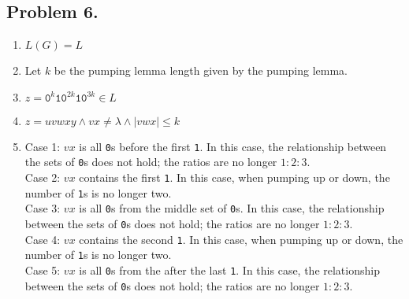 \documentclass{article}
\begin{document}
\subsection*{Problem 6.}

\begin{enumerate}
  \item \(L\left(G\right) = L\)
  \item Let \(k\) be the pumping lemma length given by the pumping lemma.
  \item \(z = \texttt{0}^{k}\texttt{1}\texttt{0}^{2k}\texttt{1}\texttt{0}^{3k} \in L\)
  \item \(z = uvwxy \wedge vx \neq \lambda \wedge \left|vwx\right| \leq k\)
  \item Case 1: \(vx\) is all \texttt{0}s before the first \texttt{1}.  In this case, the relationship between the sets of \texttt{0}s does not hold; the ratios are no longer \(1:2:3\).\\
  Case 2: \(vx\) contains the first \texttt{1}.  In this case, when pumping up or down, the number of \texttt{1}s is no longer two.\\
  Case 3: \(vx\) is all \texttt{0}s from the middle set of \texttt{0}s.  In this case, the relationship between the sets of \texttt{0}s does not hold; the ratios are no longer \(1:2:3\).\\
  Case 4: \(vx\) contains the second \texttt{1}.  In this case, when pumping up or down, the number of \texttt{1}s is no longer two.\\
  Case 5: \(vx\) is all \texttt{0}s from the after the last \texttt{1}.  In this case, the relationship between the sets of \texttt{0}s does not hold; the ratios are no longer \(1:2:3\).\\
\end{enumerate}
\end{document}
